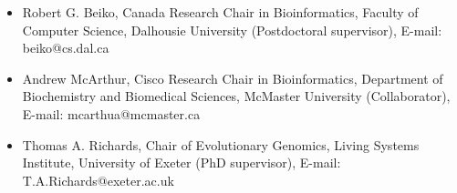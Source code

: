 \documentclass[10pt,a4paper,sans]{moderncv}        %
\begin{document}
\begin{itemize}
    \item Robert G. Beiko, Canada Research Chair in Bioinformatics, Faculty of Computer Science, Dalhousie University (Postdoctoral supervisor), E-mail: beiko@cs.dal.ca
    \item Andrew McArthur, Cisco Research Chair in Bioinformatics, Department of Biochemistry and Biomedical Sciences, McMaster University (Collaborator), E-mail: mcarthua@mcmaster.ca
    \item Thomas A. Richards, Chair of Evolutionary Genomics, Living Systems Institute, University of Exeter (PhD supervisor), E-mail: T.A.Richards@exeter.ac.uk
\end{itemize}
% 




% 

%

\end{document}
